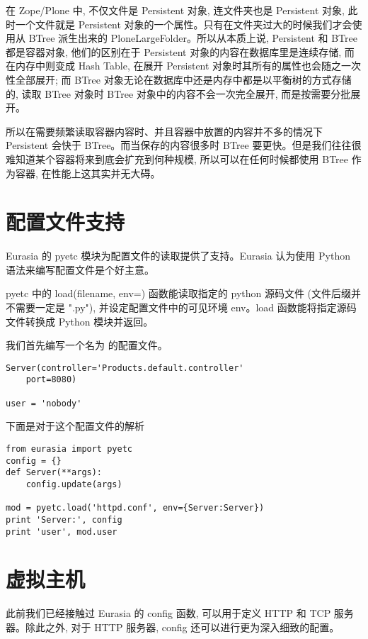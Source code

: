 \documentclass{manual}
\begin{document}
在 Zope/Plone 中, 不仅文件是 Persistent 对象, 连文件夹也是 Persistent 对象, 此时一个文件就是 Persistent 对象的一个属性。只有在文件夹过大的时候我们才会使用从 BTree 派生出来的 PloneLargeFolder。所以从本质上说, Persistent 和 BTree 都是容器对象, 他们的区别在于 Persistent 对象的内容在数据库里是连续存储, 而在内存中则变成 Hash Table, 在展开 Persistent 对象时其所有的属性也会随之一次性全部展开; 而 BTree 对象无论在数据库中还是内存中都是以平衡树的方式存储的, 读取 BTree 对象时 BTree 对象中的内容不会一次完全展开, 而是按需要分批展开。

所以在需要频繁读取容器内容时、并且容器中放置的内容并不多的情况下 Persistent 会快于 BTree。而当保存的内容很多时 BTree 要更快。但是我们往往很难知道某个容器将来到底会扩充到何种规模, 所以可以在任何时候都使用 BTree 作为容器, 在性能上这其实并无大碍。

\section{配置文件支持}

Eurasia 的 pyetc 模块为配置文件的读取提供了支持。Eurasia 认为使用 Python 语法来编写配置文件是个好主意。

pyetc 中的 load(filename, env={}) 函数能读取指定的 python 源码文件 (文件后缀并不需要一定是 ".py"), 并设定配置文件中的可见环境 env。load 函数能将指定源码文件转换成 Python 模块并返回。

我们首先编写一个名为  的配置文件。

\begin{verbatim}
Server(controller='Products.default.controller'
	port=8080)

user = 'nobody'
\end{verbatim}

下面是对于这个配置文件的解析

\begin{verbatim}
from eurasia import pyetc
config = {}
def Server(**args):
	config.update(args)

mod = pyetc.load('httpd.conf', env={Server:Server})
print 'Server:', config
print 'user', mod.user
\end{verbatim}

\section{虚拟主机}

此前我们已经接触过 Eurasia 的 config 函数, 可以用于定义 HTTP 和 TCP 服务器。除此之外, 对于 HTTP 服务器, config 还可以进行更为深入细致的配置。
\end{document}
